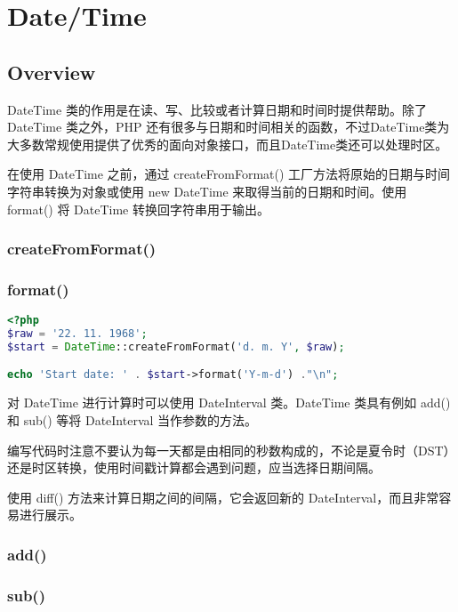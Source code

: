 \part{Date/Time}


\chapter{Overview}


DateTime 类的作用是在读、写、比较或者计算日期和时间时提供帮助。除了 DateTime 类之外，PHP 还有很多与日期和时间相关的函数，不过DateTime类为大多数常规使用提供了优秀的面向对象接口，而且DateTime类还可以处理时区。

在使用 DateTime 之前，通过 createFromFormat() 工厂方法将原始的日期与时间字符串转换为对象或使用 new DateTime 来取得当前的日期和时间。使用 format() 将 DateTime 转换回字符串用于输出。

\section{createFromFormat()}



\section{format()}


\begin{lstlisting}[language=PHP]
<?php
$raw = '22. 11. 1968';
$start = DateTime::createFromFormat('d. m. Y', $raw);

echo 'Start date: ' . $start->format('Y-m-d') ."\n";
\end{lstlisting}


对 DateTime 进行计算时可以使用 DateInterval 类。DateTime 类具有例如 add() 和 sub() 等将 DateInterval 当作参数的方法。

编写代码时注意不要认为每一天都是由相同的秒数构成的，不论是夏令时（DST）还是时区转换，使用时间戳计算都会遇到问题，应当选择日期间隔。

使用 diff() 方法来计算日期之间的间隔，它会返回新的 DateInterval，而且非常容易进行展示。

\section{add()}



\section{sub()}


